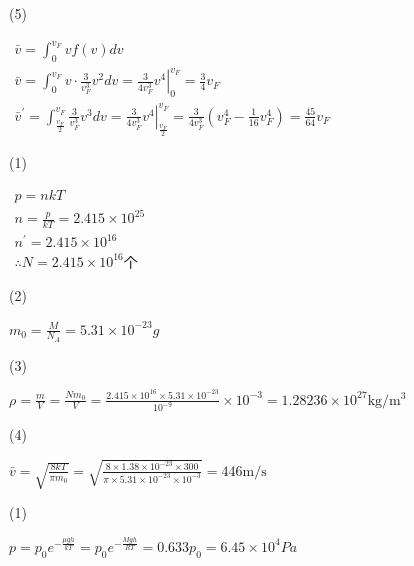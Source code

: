\documentclass[b5paper,opensource]{./template/qyxf-book}
\begin{document}
(5)

$
\begin{array} { c } { \bar { v } = \int _ { 0 } ^ { v _ { F } } v f ( v ) d v } \\ { \bar { v } = \int _ { 0 } ^ { v _ { F } } v \cdot \frac { 3 } { v _ { F } ^ { 3 } } v ^ { 2 } d v = \left. \frac { 3 } { 4 v _ { F } ^ { 3 } } v ^ { 4 } \right| _ { 0 } ^ { v _ { F } } = \frac { 3 } { 4 } v _ { F } } \\ { \bar { v } ^ { \prime } = \int _ { \frac { v _ { F } } { 2 } } ^ { v _ { F } } \frac { 3 } { v _ { F } ^ { 3 } } v ^ { 3 } d v = \left. \frac { 3 } { 4 v _ { F } ^ { 3 } } v ^ { 4 } \right| _ { \frac { v _ { F } } { 2 } } ^ { v _ { F } } = \frac { 3 } { 4 v _ { F } ^ { 3 } } \left( v _ { F } ^ { 4 } - \frac { 1 } { 16 } v _ { F } ^ { 4 } \right) = \frac { 45 } { 64 } v _ { F } } \end{array}
$


\solve
(1)

$
\begin{array} { c } { p = n k T } \\ { n = \frac { p } { k T } = 2.415 \times 10 ^ { 25 } } \\ { n ^ { \prime } = 2.415 \times 10 ^ { 16 } } \\ { \therefore N = 2.415 \times 10 ^ { 16 } \mbox{个} } \end{array}
$

(2)

$
m _ { 0 } = \frac { M } { N _ { A } } = 5.31 \times 10 ^ { - 23 } g
$

(3)

$
\rho = \frac { m } { V } = \frac { N m _ { 0 } } { V } = \frac { 2.415 \times 10 ^ { 16 } \times 5.31 \times 10 ^ { - 23 } } { 10 ^ { - 9 } } \times 10 ^ { - 3 } = 1.28236 \times 10 ^ { 27 } \mathrm { kg } / \mathrm { m } ^ { 3 }
$

(4)

$
\bar { v } = \sqrt { \frac { 8 k T } { \pi m _ { 0 } } } = \sqrt { \frac { 8 \times 1.38 \times 10 ^ { - 23 } \times 300 } { \pi \times 5.31 \times 10 ^ { - 23 } \times 10 ^ { - 3 } } } = 446 \mathrm { m } / \mathrm { s }
$



\solve

(1)

$
p = p _ { 0 } e ^ { - \frac { \mu g h } { k T } } = p _ { 0 } e ^ { - \frac { M g h } { R T } } = 0.633 p _ { 0 } = 6.45 \times 10 ^ { 4 } P a
$
\end{document}
